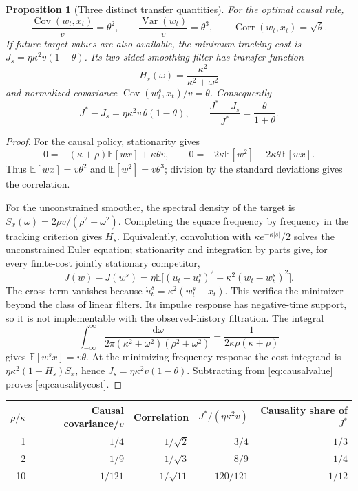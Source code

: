 \documentclass[11pt]{article}
\theoremstyle{plain}
\newtheorem{proposition}[theorem]{Proposition}
\theoremstyle{definition}
\theoremstyle{remark}
\newcommand{\E}{\mathbb E}
\newcommand{\dd}{\,\mathrm d}
\DeclareMathOperator{\Var}{Var}
\DeclareMathOperator{\Cov}{Cov}
\DeclareMathOperator{\Corr}{Corr}
\begin{document}
\begin{proposition}[Three distinct transfer quantities]\label{prop:transfer}
For the optimal causal rule,
\[
\frac{\Cov(w_t,x_t)}v=\theta^2,\qquad
\frac{\Var(w_t)}v=\theta^3,\qquad
\Corr(w_t,x_t)=\sqrt{\theta}.
\]
If future target values are also available, the minimum tracking cost
is \(J_s=\eta\kappa^2v(1-\theta)\). Its two-sided smoothing filter has
transfer function
\[
H_s(\omega)=\frac{\kappa^2}{\kappa^2+\omega^2}
\]
and normalized covariance \(\Cov(w_t^s,x_t)/v=\theta\).
Consequently
\begin{equation}\label{eq:causalitycost}
J^\ast-J_s=\eta\kappa^2v\,\theta(1-\theta),\qquad
\frac{J^\ast-J_s}{J^\ast}=\frac{\theta}{1+\theta}.
\end{equation}
\end{proposition}
\begin{proof}
For the causal policy, stationarity gives
\[
0=-(\kappa+\rho)\E[wx]+\kappa\theta v,\qquad
0=-2\kappa\E[w^2]+2\kappa\theta\E[wx].
\]
Thus \(\E[wx]=v\theta^2\) and \(\E[w^2]=v\theta^3\);
division by the standard deviations gives the correlation.

For the unconstrained smoother, the spectral density of the target is
\(S_x(\omega)=2\rho v/(\rho^2+\omega^2)\).
Completing the square frequency by frequency in the tracking criterion
gives \(H_s\). Equivalently, convolution with
\(\kappa e^{-\kappa|s|}/2\) solves the unconstrained Euler equation;
stationarity and integration by parts give, for every finite-cost
jointly stationary competitor,
\[
J(w)-J(w^s)=
\eta\E\big[(u_t-u_t^s)^2+\kappa^2(w_t-w_t^s)^2\big].
\]
The cross term vanishes because
\(\dot u_t^s=\kappa^2(w_t^s-x_t)\).
This verifies the minimizer beyond the class of linear filters.
Its impulse response has negative-time support, so it
is not implementable with the observed-history filtration.
The integral
\[
\int_{-\infty}^{\infty}
\frac{\dd\omega}{2\pi(\kappa^2+\omega^2)(\rho^2+\omega^2)}
=\frac{1}{2\kappa\rho(\kappa+\rho)}
\]
gives \(\E[w^sx]=v\theta\).
At the minimizing frequency response the cost integrand is
\(\eta\kappa^2(1-H_s)S_x\), hence \(J_s=\eta\kappa^2v(1-\theta)\).
Subtracting from \eqref{eq:causalvalue} proves \eqref{eq:causalitycost}.
\end{proof}

\begin{center}
\begin{tabular}{@{}rrrrr@{}}
\toprule
\(\rho/\kappa\)&Causal covariance/\(v\)&Correlation&
\(J^\ast/(\eta\kappa^2v)\)&Causality share of \(J^\ast\)\\
\midrule
1&\(1/4\)&\(1/\sqrt2\)&\(3/4\)&\(1/3\)\\
2&\(1/9\)&\(1/\sqrt3\)&\(8/9\)&\(1/4\)\\
10&\(1/121\)&\(1/\sqrt{11}\)&\(120/121\)&\(1/12\)\\
\bottomrule
\end{tabular}
\end{center}
\end{document}
